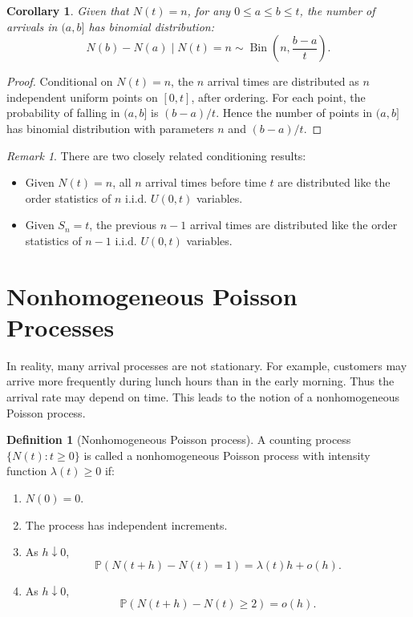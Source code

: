 \documentclass[11pt]{article}
\theoremstyle{plain}
\newtheorem{corollary}[theorem]{Corollary}
\theoremstyle{definition}
\newtheorem{definition}[theorem]{Definition}
\theoremstyle{remark}
\newtheorem{remark}[theorem]{Remark}
\begin{document}
	
	\begin{corollary}
		Given that \(N(t)=n\), for any \(0\le a\le b\le t\), the number of arrivals in \((a,b]\) has binomial distribution:
		\[
		N(b)-N(a)\mid N(t)=n
		\sim
		\operatorname{Bin}\left(n,\frac{b-a}{t}\right).
		\]
	\end{corollary}
	
	\begin{proof}
		Conditional on \(N(t)=n\), the \(n\) arrival times are distributed as \(n\) independent uniform points on \([0,t]\), after ordering. For each point, the probability of falling in \((a,b]\) is \((b-a)/t\). Hence the number of points in \((a,b]\) has binomial distribution with parameters \(n\) and \((b-a)/t\).
	\end{proof}
	


	
	\begin{remark}
		There are two closely related conditioning results:
		\begin{itemize}[leftmargin=2em]
			\item Given \(N(t)=n\), all \(n\) arrival times before time \(t\) are distributed like the order statistics of \(n\) i.i.d. \(U(0,t)\) variables.
			\item Given \(S_n=t\), the previous \(n-1\) arrival times are distributed like the order statistics of \(n-1\) i.i.d. \(U(0,t)\) variables.
		\end{itemize}
	\end{remark}
	
	
	\section{Nonhomogeneous Poisson Processes}
	
	In reality, many arrival processes are not stationary. For example, customers may arrive more frequently during lunch hours than in the early morning. Thus the arrival rate may depend on time. This leads to the notion of a nonhomogeneous Poisson process.
	
	\begin{definition}[Nonhomogeneous Poisson process]
		A counting process \(\{N(t):t\ge 0\}\) is called a nonhomogeneous Poisson process with intensity function \(\lambda(t)\ge 0\) if:
		\begin{enumerate}[label=(\roman*),leftmargin=2em]
			\item \(N(0)=0\).
			\item The process has independent increments.
			\item As \(h\downarrow 0\),
			\[
			\mathbb{P}(N(t+h)-N(t)=1)=\lambda(t)h+o(h).
			\]
			\item As \(h\downarrow 0\),
			\[
			\mathbb{P}(N(t+h)-N(t)\ge 2)=o(h).
			\]
		\end{enumerate}
	\end{definition}
	
\end{document}
